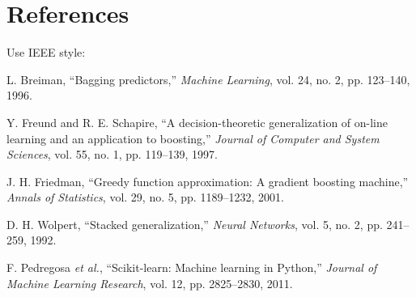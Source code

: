 \documentclass[12pt,a4paper]{article}
\begin{document}
\section{References}
Use IEEE style:
\begin{enumerate}[label={[\arabic*]}]
\item L. Breiman, ``Bagging predictors,'' \textit{Machine Learning}, vol. 24, no. 2, pp. 123--140, 1996.
\item Y. Freund and R. E. Schapire, ``A decision-theoretic generalization of on-line learning and an application to boosting,'' \textit{Journal of Computer and System Sciences}, vol. 55, no. 1, pp. 119--139, 1997.
\item J. H. Friedman, ``Greedy function approximation: A gradient boosting machine,'' \textit{Annals of Statistics}, vol. 29, no. 5, pp. 1189--1232, 2001.
\item D. H. Wolpert, ``Stacked generalization,'' \textit{Neural Networks}, vol. 5, no. 2, pp. 241--259, 1992.
\item F. Pedregosa \textit{et al.}, ``Scikit-learn: Machine learning in Python,'' \textit{Journal of Machine Learning Research}, vol. 12, pp. 2825--2830, 2011.
\end{enumerate}
\end{document}
